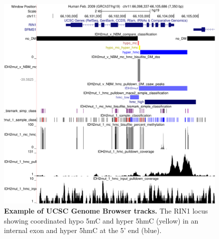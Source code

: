 \begin{figure}[ht!]
\centering
\includegraphics[width=1\textwidth]{chap5figs/figure5_4.pdf}
\caption[Example of UCSC Genome Browser tracks.]
{
\textbf{Example of UCSC Genome Browser tracks.} The RIN1 locus showing coordinated hypo 5mC and hyper 5hmC (yellow) in an internal exon and hyper 5hmC at the 5' end (blue).
}
\label{chap5:fig:4}
\end{figure}

\newpage

